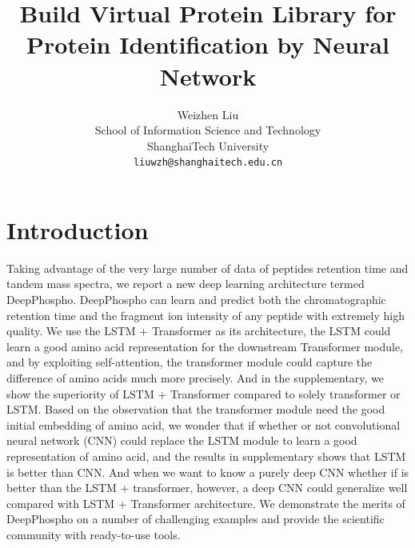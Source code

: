 \documentclass[final]{cvpr}
\begin{document}
\title{Build Virtual Protein Library for Protein Identification by Neural Network}

\author{Weizhen Liu\\
School of Information Science and Technology\\
ShanghaiTech University\\
{\tt\small liuwzh@shanghaitech.edu.cn}}

\maketitle




\section{Introduction}

Taking advantage of the very large number of data of peptides retention time and tandem mass spectra,
we report a new deep learning architecture termed DeepPhospho. DeepPhospho can learn and predict both the 
chromatographic retention time and the fragment ion intensity of any peptide with extremely high quality. 
We use the LSTM + Transformer as its architecture, the LSTM could learn a good amino acid representation 
for the downstream Transformer module, and by exploiting self-attention, the transformer module could capture 
the difference of amino acids much more precisely. And in the supplementary, we show the superiority of LSTM + 
Transformer compared to solely transformer or LSTM. Based on the observation that the transformer module need 
the good initial embedding of amino acid, we wonder that if whether or not convolutional neural network (CNN) 
could replace the LSTM module to learn a good representation of amino acid, and the results in supplementary shows 
that LSTM is better than CNN. And when we want to know a purely deep CNN whether if is better than the LSTM + transformer,
however, a deep CNN could generalize well compared with LSTM + Transformer architecture.
We demonstrate the merits of DeepPhospho on a number of challenging examples and provide the scientific community with ready-to-use tools.
\end{document}
